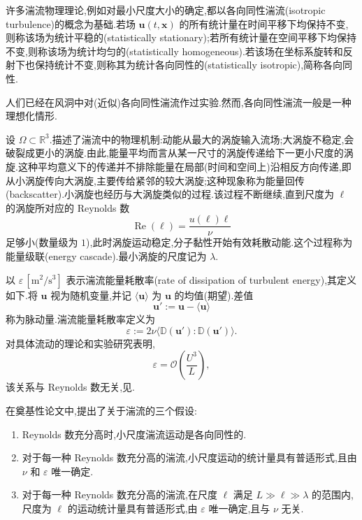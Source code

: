 \begin{note}[各向同性湍流的概念]
\label{note:isotropic-turbulence-concept}
许多湍流物理理论,例如对最小尺度大小的确定,都以各向同性湍流(isotropic turbulence)的概念为基础.若场 $\bm{u}(t,\bm{x})$ 的所有统计量在时间平移下均保持不变,则称该场为统计平稳的(statistically stationary);若所有统计量在空间平移下均保持不变,则称该场为统计均匀的(statistically homogeneous).若该场在坐标系旋转和反射下也保持统计不变,则称其为统计各向同性的(statistically isotropic),简称各向同性.

人们已经在风洞中对(近似)各向同性湍流作过实验.然而,各向同性湍流一般是一种理想化情形.
\end{note}

\begin{note}
\label{note:richardson-energy-cascade}
设 $\Omega\subset\mathbb{R}^3$.\textcite{Richardson1922}描述了湍流中的物理机制:动能从最大的涡旋输入流场;大涡旋不稳定,会破裂成更小的涡旋.由此,能量平均而言从某一尺寸的涡旋传递给下一更小尺度的涡旋.这种平均意义下的传递并不排除能量在局部(时间和空间上)沿相反方向传递,即从小涡旋传向大涡旋,主要传给紧邻的较大涡旋;这种现象称为能量回传(backscatter).小涡旋也经历与大涡旋类似的过程.该过程不断继续,直到尺度为 $\ell$ 的涡旋所对应的 Reynolds 数
\[
 \operatorname{Re}(\ell)=\frac{u(\ell)\ell}{\nu}
\]
足够小(数量级为 $1$),此时涡旋运动稳定,分子黏性开始有效耗散动能.这个过程称为能量级联(energy cascade).最小涡旋的尺度记为 $\lambda$.
\end{note}

\begin{note}[湍流能量耗散率]
\label{note:turbulent-energy-dissipation-rate}
以 $\varepsilon\,[\mathrm{m}^2/\mathrm{s}^3]$ 表示湍流能量耗散率(rate of dissipation of turbulent energy),其定义如下.将 $\bm{u}$ 视为随机变量,并记 $\langle\bm{u}\rangle$ 为 $\bm{u}$ 的均值(期望).差值
\[
 \bm{u}' := \bm{u}-\langle\bm{u}\rangle
\]
称为脉动量.湍流能量耗散率定义为
\[
 \varepsilon := 2\nu\langle\mathbb{D}(\bm{u}'):\mathbb{D}(\bm{u}')\rangle.
\]
对具体流动的理论和实验研究表明,
\begin{equation}\label{eq:turbulent-energy-dissipation-scaling}
 \varepsilon=\mathcal{O}\!\left(\frac{U^3}{L}\right),
\end{equation}
该关系与 Reynolds 数无关,见\textcite[p.~183]{Pope2000}.
\end{note}

\begin{note}[Kolmogorov 假设]
\label{note:kolmogorov-hypotheses}
在奠基性论文\textcite{Kolmogoroff1941}中,提出了关于湍流的三个假设:
\begin{enumerate}
 \item Reynolds 数充分高时,小尺度湍流运动是各向同性的.
 \item 对于每一种 Reynolds 数充分高的湍流,小尺度运动的统计量具有普适形式,且由 $\nu$ 和 $\varepsilon$ 唯一确定.
 \item 对于每一种 Reynolds 数充分高的湍流,在尺度 $\ell$ 满足 $L\gg\ell\gg\lambda$ 的范围内,尺度为 $\ell$ 的运动统计量具有普适形式,由 $\varepsilon$ 唯一确定,且与 $\nu$ 无关.
\end{enumerate}
\end{note}

